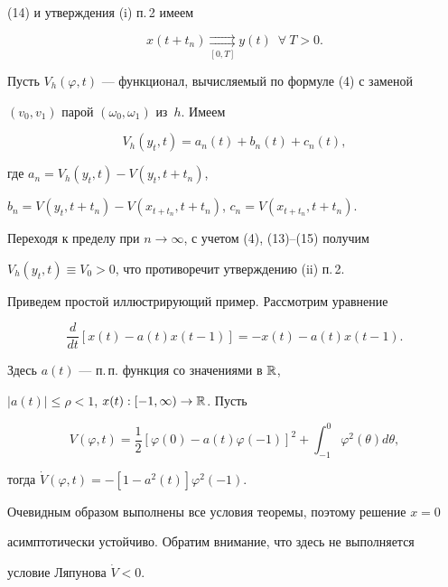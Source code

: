 \begin{pf}
(14) и утверждения (i) п.\,2 имеем


\begin{equation}


x(t+t_n)\underset{[0,T]}{\rightrightarrows}{}


y(t)\ \; \forall\>T>0.


\end{equation}


Пусть $V_h(\varphi,t)$ --- функционал, вычисляемый по формуле (4) с заменой


$(v_0,v_1)$ парой $(\omega_0,\omega_1)$ из~$h$. Имеем


$$


V_h(y_t,t)=a_n(t)+b_n(t)+c_n(t),


$$


где $a_n=V_h(y_t,t)-V(y_t,t+t_n)$,


$b_n=V(y_t,t+t_n)-V(x_{t+t_n},t+t_n)$, $c_n=V(x_{t+t_n},t+t_n)$.


Переходя к пределу при $n\to\infty$, с учетом (4), (13)--(15) получим


$V_h(y_t,t)\equiv V_0>0$, что противоречит утверждению (ii) п.\,2.


\end{pf}





Приведем простой иллюстрирующий пример. Рассмотрим уравнение


$$


\frac{d}{dt}[x(t)-a(t)x(t-1)]=-x(t)-a(t)x(t-1).


$$


Здесь $a(t)$ --- п.\,п. функция со значениями в $\Bbb{R}$,


$|a(t)|\leqslant\rho<1$, $x(t):[-1,\infty)\to\Bbb{R}$. Пусть


$$


V(\varphi,t)=\frac12[\varphi(0)-a(t)\varphi(-1)]^2+


\int_{-1}^0\varphi^2(\theta)d\theta,


$$


тогда $\Dot V(\varphi,t)=-[1-a^2(t)]\varphi^2(-1)$.


Очевидным образом выполнены все условия теоремы, поэтому решение $x=0$


асимптотически устойчиво. Обратим внимание, что здесь не выполняется


условие Ляпунова $\Dot V<0$.






